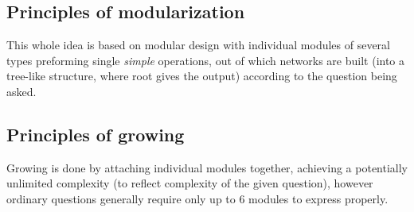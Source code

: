 \documentclass[a4paper,twocolumn]{article}
\begin{document}
\subsection*{Principles of modularization}
This whole idea is based on modular design with individual modules of several types preforming single \textit{simple} operations, out of which networks are built (into a tree-like structure, where root gives the output) according to the question being asked.

\subsection*{Principles of growing}
Growing is done by attaching individual modules together, achieving a potentially unlimited complexity (to reflect complexity of the given question), however ordinary questions generally require only up to 6 modules to express properly.
\end{document}

